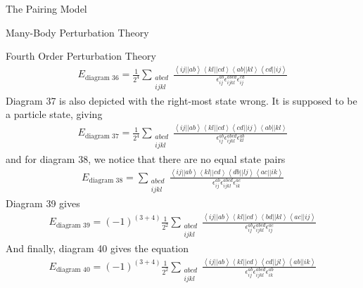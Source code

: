 \documentclass[twoside,english]{uiofysmaster}
\begin{document}
\begin{chapter}{The Pairing Model}
\begin{section}{Many-Body Perturbation Theory}
\begin{subsection}{Fourth Order Perturbation Theory}
			\begin{align}
				E_{\text{diagram 36}} = \frac{1}{2^4} \sum_{\substack{abcd\\ijkl}} \frac{ \left<ij||ab\right>\left<kl||cd\right>\left<ab||kl\right>\left<cd||ij\right> }{ \epsilon_{ij}^{ab} \epsilon_{ijkl}^{abcd} \epsilon_{ij}^{cd} }
			\end{align}
			Diagram 37 is also depicted with the right-most state wrong. It is supposed to be a particle state, giving
			\begin{align}
				E_{\text{diagram 37}} = \frac{1}{2^4} \sum_{\substack{abcd\\ijkl}} \frac{ \left<ij||ab\right>\left<kl||cd\right>\left<cd||ij\right>\left<ab||kl\right> }{ \epsilon_{ij}^{ab} \epsilon_{ijkl}^{abcd} \epsilon_{kl}^{ab} }
			\end{align}
			and for diagram 38, we notice that there are no equal state pairs
			\begin{align}
				E_{\text{diagram 38}} = \sum_{\substack{abcd\\ijkl}} \frac{ \left<ij||ab\right>\left<kl||cd\right>\left<db||lj\right>\left<ac||ik\right> }{ \epsilon_{ij}^{ab} \epsilon_{ijkl}^{abcd} \epsilon_{ik}^{ac} }
			\end{align}
			Diagram 39 gives
			\begin{align}
				E_{\text{diagram 39}} = \left(-1\right)^{(3+4)} \frac{1}{2^2} \sum_{\substack{abcd\\ijkl}} \frac{ \left<ij||ab\right>\left<kl||cd\right>\left<bd||kl\right>\left<ac||ij\right> }{ \epsilon_{ij}^{ab} \epsilon_{ijkl}^{abcd} \epsilon_{ij}^{ac} }
			\end{align}
			And finally, diagram 40 gives the equation
			\begin{align}
				E_{\text{diagram 40}} = \left(-1\right)^{(3+4)} \frac{1}{2^2} \sum_{\substack{abcd\\ijkl}} \frac{ \left<ij||ab\right>\left<kl||cd\right>\left<cd||jl\right>\left<ab||ik\right> }{ \epsilon_{ij}^{ab} \epsilon_{ijkl}^{abcd} \epsilon_{ik}^{ab} }
			\end{align}
			
		\end{subsection}
 		
 	\end{section}


\end{chapter}
\end{document}
